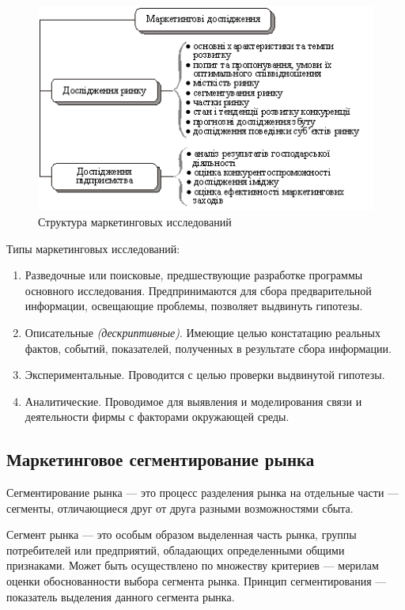 \documentclass[a4paper,12pt,oneside,final]{extarticle}
\makeatletter
\numberwithin{equation}{section}
\def\maxwidth#1{\ifdim\Gin@nat@width>#1 #1\else\Gin@nat@width\fi}
\makeatother
\begin{document}
\begin{figure}[h]
	\centering
	\includegraphics[width=\maxwidth{\textwidth}]{management-figures/marketing_structure}
	\caption{Структура маркетинговых исследований}
\end{figure}

Типы маркетинговых исследований:
\begin{enumerate}
	\item Разведочные или поисковые, предшествующие разработке программы основного исследования. 
	Предпринимаются для сбора предварительной информации, освещающие проблемы, позволяет выдвинуть гипотезы.
	\item Описательные \textit{(дескриптивные)}. 
	Имеющие целью констатацию реальных фактов, событий, показателей, полученных в результате сбора информации. 
	\item Экспериментальные. 
	Проводится с целью проверки выдвинутой гипотезы.
	\item Аналитические. 
	Проводимое для выявления и моделирования связи и деятельности фирмы с факторами окружающей среды. 
\end{enumerate}

\subsection{Маркетинговое сегментирование рынка}
Сегментирование рынка --- это процесс разделения рынка на отдельные части --- сегменты, отличающиеся друг от друга разными возможностями сбыта.

Сегмент рынка --- это особым образом выделенная часть рынка, группы потребителей или предприятий, обладающих определенными общими признаками. 
Может быть осуществлено по множеству критериев --- мерилам оценки обоснованности выбора сегмента рынка. 
Принцип сегментирования --- показатель выделения данного сегмента рынка. 
\end{document}
